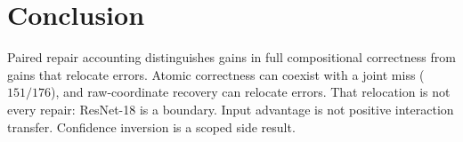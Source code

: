 \section{Conclusion}
\label{sec:conclusion}

Paired repair accounting distinguishes gains in full compositional
correctness from gains that relocate errors. Atomic correctness can
coexist with a joint miss ($151/176$), and raw-coordinate recovery can
relocate errors. That relocation is not every repair: ResNet-18 is a
boundary. Input advantage is not positive interaction transfer.
Confidence inversion is a scoped side result.
